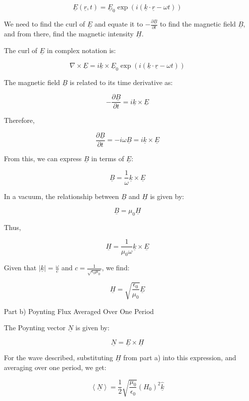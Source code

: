 \[
\underline{E}(\underline{r}, t) = \underline{E}_{0} \exp(i(\underline{k} \cdot \underline{r} - \omega t))
\]

We need to find the curl of \(\underline{E}\) and equate it to \(-\frac{\partial \underline{B}}{\partial t}\) to find the magnetic field \(\underline{B}\), and from there, find the magnetic intensity \(\underline{H}\).

The curl of \(\underline{E}\) in complex notation is:

\[
\nabla \times \underline{E} = i\underline{k} \times \underline{E}_{0} \exp(i(\underline{k} \cdot \underline{r} - \omega t))
\]

The magnetic field \(\underline{B}\) is related to its time derivative as:

\[
-\frac{\partial \underline{B}}{\partial t} = i\underline{k} \times \underline{E}
\]

Therefore,

\[
\frac{\partial \underline{B}}{\partial t} = -i\omega \underline{B} = i\underline{k} \times \underline{E}
\]

From this, we can express \(\underline{B}\) in terms of \(\underline{E}\):

\[
\underline{B} = \frac{1}{\omega} \underline{k} \times \underline{E}
\]

In a vacuum, the relationship between \(\underline{B}\) and \(\underline{H}\) is given by:

\[
\underline{B} = \mu_{0} \underline{H}
\]

Thus,

\[
\underline{H} = \frac{1}{\mu_{0}\omega} \underline{k} \times \underline{E}
\]

Given that \(|\underline{k}| = \frac{\omega}{c}\) and \(c = \frac{1}{\sqrt{\epsilon_{0}\mu_{0}}}\), we find:

\[
\underline{H} = \sqrt{\frac{\epsilon_{0}}{\mu_{0}}} \underline{E}
\]

Part b) Poynting Flux Averaged Over One Period

The Poynting vector \(\underline{N}\) is given by:

\[
\underline{N} = \underline{E} \times \underline{H}
\]

For the wave described, substituting \(\underline{H}\) from part a) into this expression, and averaging over one period, we get:

\[
\left< \underline{N} \right> = \frac{1}{2} \sqrt{\frac{\mu_{0}}{\epsilon_{0}}} (H_{0})^{2} \hat{\underline{k}}
\]


